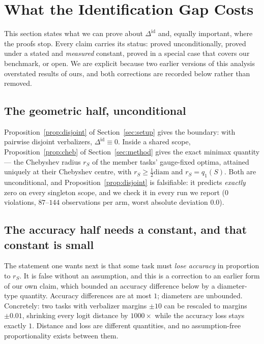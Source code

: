 \section{What the Identification Gap Costs}
\label{sec:theory}

This section states what we can prove about $\Delta^{\mathrm{id}}$ and, equally
important, where the proofs stop. Every claim carries its status: proved
unconditionally, proved under a stated and \emph{measured} constant, proved in a
special case that covers our benchmark, or open. We are explicit because two
earlier versions of this analysis overstated results of ours, and both corrections
are recorded below rather than removed.

\subsection{The geometric half, unconditional}

Proposition~\ref{prop:disjoint} of Section~\ref{sec:setup} gives the boundary:
with pairwise disjoint verbalizers, $\Delta^{\mathrm{id}}\equiv0$. Inside a shared
scope, Proposition~\ref{prop:cheb} of Section~\ref{sec:method} gives the exact
minimax quantity --- the Chebyshev radius $r_S$ of the member tasks' gauge-fixed
optima, attained uniquely at their Chebyshev centre, with
$r_S\ge\tfrac12\mathrm{diam}$ and $r_S=q_1(S)$. Both are unconditional, and
Proposition~\ref{prop:disjoint} is falsifiable: it predicts \emph{exactly} zero on
every singleton scope, and we check it in every run we report ($0$ violations,
$87$--$144$ observations per arm, worst absolute deviation $0.0$).

\subsection{The accuracy half needs a constant, and that constant is small}

The statement one wants next is that some task must \emph{lose accuracy} in
proportion to $r_S$. It is false without an assumption, and this is a correction to
an earlier form of our own claim, which bounded an accuracy difference below by a
diameter-type quantity. Accuracy differences are at most $1$; diameters are
unbounded. Concretely: two tasks with verbalizer margins $\pm10$ can be rescaled
to margins $\pm0.01$, shrinking every logit distance by $1000\times$ while the
accuracy loss stays exactly $1$. Distance and loss are different quantities, and no
assumption-free proportionality exists between them.

